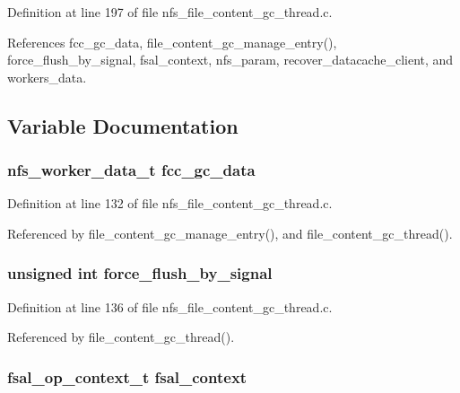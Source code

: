 Definition at line 197 of file nfs\_\-file\_\-content\_\-gc\_\-thread.c.

References fcc\_\-gc\_\-data, file\_\-content\_\-gc\_\-manage\_\-entry(), force\_\-flush\_\-by\_\-signal, fsal\_\-context, nfs\_\-param, recover\_\-datacache\_\-client, and workers\_\-data.

\subsection{Variable Documentation}
\subsubsection{\setlength{\rightskip}{0pt plus 5cm}nfs\_\-worker\_\-data\_\-t {\bf fcc\_\-gc\_\-data}}\label{nfs__file__content__gc__thread_8c_a3}




Definition at line 132 of file nfs\_\-file\_\-content\_\-gc\_\-thread.c.

Referenced by file\_\-content\_\-gc\_\-manage\_\-entry(), and file\_\-content\_\-gc\_\-thread().
\subsubsection{\setlength{\rightskip}{0pt plus 5cm}unsigned int {\bf force\_\-flush\_\-by\_\-signal}}\label{nfs__file__content__gc__thread_8c_a5}




Definition at line 136 of file nfs\_\-file\_\-content\_\-gc\_\-thread.c.

Referenced by file\_\-content\_\-gc\_\-thread().
\subsubsection{\setlength{\rightskip}{0pt plus 5cm}fsal\_\-op\_\-context\_\-t {\bf fsal\_\-context}}\label{nfs__file__content__gc__thread_8c_a4}




